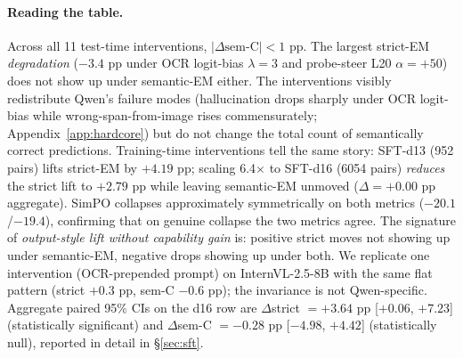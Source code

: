 \paragraph{Reading the table.}
Across all 11 test-time interventions, $|\Delta\text{sem-C}| < 1$ pp. The largest strict-EM \emph{degradation} ($-3.4$ pp under OCR logit-bias $\lambda=3$ and probe-steer L20 $\alpha=+50$) does not show up under semantic-EM either. The interventions visibly redistribute Qwen's failure modes (hallucination drops sharply under OCR logit-bias while wrong-span-from-image rises commensurately; Appendix~\ref{app:hardcore}) but do not change the total count of semantically correct predictions. Training-time interventions tell the same story: SFT-d13 (952 pairs) lifts strict-EM by $+4.19$ pp; scaling 6.4$\times$ to SFT-d16 (6054 pairs) \emph{reduces} the strict lift to $+2.79$ pp while leaving semantic-EM unmoved ($\Delta = +0.00$ pp aggregate). SimPO collapses approximately symmetrically on both metrics ($-20.1$/$-19.4$), confirming that on genuine collapse the two metrics agree. The signature of \emph{output-style lift without capability gain} is: positive strict moves not showing up under semantic-EM, negative drops showing up under both. We replicate one intervention (OCR-prepended prompt) on InternVL-2.5-8B with the same flat pattern (strict $+0.3$ pp, sem-C $-0.6$ pp); the invariance is not Qwen-specific. Aggregate paired 95\% CIs on the d16 row are $\Delta$strict $=+3.64$ pp [$+0.06$, $+7.23$] (statistically significant) and $\Delta$sem-C $=-0.28$ pp [$-4.98$, $+4.42$] (statistically null), reported in detail in \S\ref{sec:sft}.
